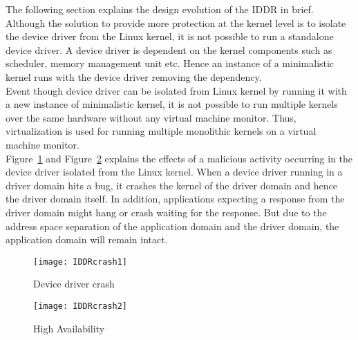 The following section explains the design evolution of the IDDR in brief. 
\\
Although the solution to provide more protection at the kernel level is to isolate the device driver from the Linux kernel, it is not possible to run a standalone device driver. A device driver is dependent on the kernel components such as scheduler, memory management unit etc. Hence an instance of a minimalistic kernel runs with the device driver removing the dependency. 
\\
Event though device driver can be isolated from Linux kernel by running it with a new instance of minimalistic kernel, it is not possible to run multiple kernels over the same hardware without any virtual machine monitor. Thus, virtualization is used for running multiple monolithic kernels on a virtual machine monitor.
\\
Figure~\ref{fig:driver crash} and Figure~\ref{fig:high avail} explains the effects of a malicious activity occurring in the device driver isolated from the Linux kernel. When a device driver running in a driver domain hits a bug, it crashes the kernel of the driver domain and hence the driver domain itself. In addition, applications expecting a response from the driver domain might hang or crash waiting for the response. But due to the address space separation of the application domain and the driver domain, the application domain will remain intact.   
\begin{figure}[!ht]
\centering
\texttt{[image: IDDRcrash1]}
\caption{Device driver crash}
\label{fig:driver crash}
\end{figure}
\begin{figure}[!ht]
\centering
\texttt{[image: IDDRcrash2]}
\caption{High Availability}
\label{fig:high avail}
\end{figure}
\pagebreak
    
